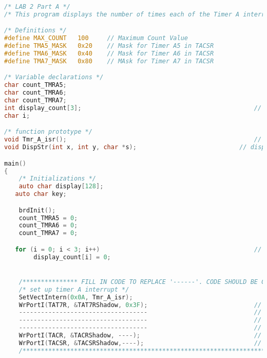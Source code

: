 \begin{lstlisting}[language=C]
/* LAB 2 Part A */
/* This program displays the number of times each of the Timer A interrupts have occured on the computer monitor */

/* Definitions */
#define	MAX_COUNT	100     // Maximum Count Value
#define TMA5_MASK   0x20    // Mask for Timer A5 in TACSR
#define TMA6_MASK	0x40    // Mask for Timer A6 in TACSR
#define TMA7_MASK	0x80    // MAsk for Timer A7 in TACSR

/* Variable declarations */
char count_TMRA5;														// This variable will count the number of times Timer A5 has triggered an interrupted
char count_TMRA6;														// This variable will count the number of times Timer A6 has triggered an interrupted
char count_TMRA7;														// This variable will count the number of times Timer A7 has triggered an interrupted
int display_count[3];												// This variable will hold the count values divided by 100
char i;																	// iterator

/* function prototype */
void Tmr_A_isr(); 													// Timer A interrupt service routine
void DispStr(int x, int y, char *s);							// display strings on computer monitor

main()
{
	/* Initializations */
	auto char display[128];
   auto char key;

	brdInit();
	count_TMRA5 = 0;													// initialize counters to zero
	count_TMRA6 = 0;													// initialize counters to zero
	count_TMRA7 = 0;													// initialize counters to zero

   for (i = 0; i < 3; i++)											// initialize display counters to zero
		display_count[i] = 0;


	/*************** FILL IN CODE TO REPLACE '------'. CODE SHOULD BE CONSISTENT WITH COMMENTS. REFER TO FIGURE 5. IN LAB MANUAL. *******************/
	/* set up timer A interrupt */
	SetVectIntern(0x0A, Tmr_A_isr); 									// set up timer A interrupt vector
	WrPortI(TAT7R, &TAT7RShadow, 0x3F);								// set TMRA7 to count down from 63
  	-----------------------------------								// set TMRA6 to count down from 127
	-----------------------------------								// set TMRA5 to count down from 255
	-----------------------------------								// set TMRA1 to count down from 255
	WrPortI(TACR, &TACRShadow, ----);								// Clock TMRA5,TMRA6,TMRA7 by TMRA1. Clock TMRA4 by PCLK/2. Set Timer A to trigger priority 1 interrupts
	WrPortI(TACSR, &TACSRShadow,----); 								// Enable interrupts for TMRA5,TMRA6,TMRA7 only. Enable main clock for Timer A
	/************************************************************************************************************************************************/



\end{lstlisting}

